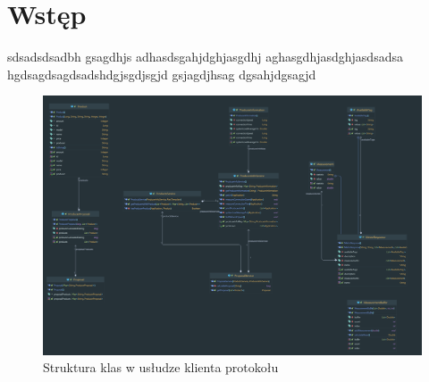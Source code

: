 \chapter{Wstęp}

sdsadsdsadbh gsagdhjs adhasdsgahjdghjasgdhj aghasgdhjasdghjasdsadsa hgdsagdsagdsadshdgjsgdjsgjd gsjagdjhsag dgsahjdgsagjd

\begin{figure}[!htbp]
    \centering
    \includegraphics[width=\textwidth]{images/Master-Protocol-Worker.png}
    \caption{Struktura klas w usłudze klienta protokołu}
    \label{fig:enter-label}
\end{figure}
